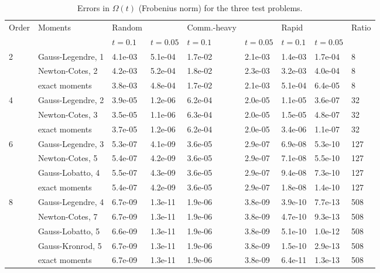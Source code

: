\documentclass[12pt]{article}
\begin{document}
\begin{table}[H]
\centering\footnotesize
\caption{Errors in $\Omega(t)$ (Frobenius norm) for the three test problems.}\label{tab:results}
\begin{tabular}{lllllllll}
\hline
Order & Moments & Random &  & Comm.-heavy &  & Rapid &  & Ratio \\
 &  & $t=0.1$ & $t=0.05$ & $t=0.1$ & $t=0.05$ & $t=0.1$ & $t=0.05$ &  \\ \hline
2 & Gauss-Legendre, 1 & 4.1e-03 & 5.1e-04 & 1.7e-02 & 2.1e-03 & 1.4e-03 & 1.7e-04 & 8 \\
 & Newton-Cotes, 2 & 4.2e-03 & 5.2e-04 & 1.8e-02 & 2.3e-03 & 3.2e-03 & 4.0e-04 & 8 \\
 & exact moments & 3.8e-03 & 4.8e-04 & 1.7e-02 & 2.1e-03 & 5.1e-04 & 6.4e-05 & 8 \\
4 & Gauss-Legendre, 2 & 3.9e-05 & 1.2e-06 & 6.2e-04 & 2.0e-05 & 1.1e-05 & 3.6e-07 & 32 \\
 & Newton-Cotes, 3 & 3.5e-05 & 1.1e-06 & 6.3e-04 & 2.0e-05 & 1.5e-05 & 4.8e-07 & 32 \\
 & exact moments & 3.7e-05 & 1.2e-06 & 6.2e-04 & 2.0e-05 & 3.4e-06 & 1.1e-07 & 32 \\
6 & Gauss-Legendre, 3 & 5.3e-07 & 4.1e-09 & 3.6e-05 & 2.9e-07 & 6.9e-08 & 5.3e-10 & 127 \\
 & Newton-Cotes, 5 & 5.4e-07 & 4.2e-09 & 3.6e-05 & 2.9e-07 & 7.1e-08 & 5.5e-10 & 127 \\
 & Gauss-Lobatto, 4 & 5.5e-07 & 4.3e-09 & 3.6e-05 & 2.9e-07 & 9.4e-08 & 7.3e-10 & 127 \\
 & exact moments & 5.4e-07 & 4.2e-09 & 3.6e-05 & 2.9e-07 & 1.8e-08 & 1.4e-10 & 127 \\
8 & Gauss-Legendre, 4 & 6.7e-09 & 1.3e-11 & 1.9e-06 & 3.8e-09 & 3.9e-10 & 7.7e-13 & 508 \\
 & Newton-Cotes, 7 & 6.7e-09 & 1.3e-11 & 1.9e-06 & 3.8e-09 & 4.7e-10 & 9.3e-13 & 508 \\
 & Gauss-Lobatto, 5 & 6.6e-09 & 1.3e-11 & 1.9e-06 & 3.8e-09 & 5.1e-10 & 1.0e-12 & 508 \\
 & Gauss-Kronrod, 5 & 6.7e-09 & 1.3e-11 & 1.9e-06 & 3.8e-09 & 1.5e-10 & 2.9e-13 & 508 \\
 & exact moments & 6.7e-09 & 1.3e-11 & 1.9e-06 & 3.8e-09 & 6.4e-11 & 1.3e-13 & 508 \\ \hline
\end{tabular}
\end{table}
\end{document}
